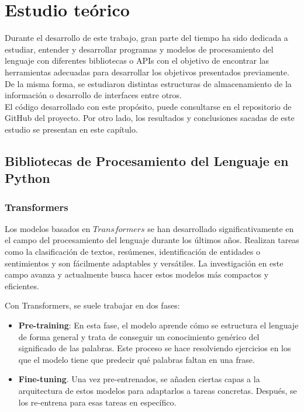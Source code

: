 \chapter{Estudio teórico}
\label{cap:Estudio teórico}
Durante el desarrollo de este trabajo, gran parte del tiempo ha sido dedicada a estudiar, entender y desarrollar programas y modelos de procesamiento del lenguaje con diferentes bibliotecas o APIs con el objetivo de encontrar las herramientas adecuadas para desarrollar los objetivos presentados previamente. De la misma forma, se estudiaron distintas estructuras de almacenamiento de la información o desarrollo de interfaces entre otros. \\

El código desarrollado con este propósito, puede consultarse en el repositorio de GitHub del proyecto. Por otro lado, los resultados y conclusiones sacadas de este estudio se presentan en este capítulo.  

\section{Bibliotecas de Procesamiento del Lenguaje en Python}

\subsection{Transformers}

Los modelos basados en $Transformers$ se han desarrollado significativamente en el campo del procesamiento del lenguaje durante los últimos años. Realizan tareas como la clasificación de textos, resúmenes, identificación de entidades o sentimientos y son fácilmente adaptables y versátiles. La investigación en este campo avanza y actualmente busca hacer estos modelos más compactos y eficientes. 

Con Transformers, se suele trabajar en dos fases:
\begin{itemize}
\item \textbf{Pre-training}: En esta fase, el modelo aprende cómo se estructura el lenguaje de forma general y trata de conseguir un conocimiento genérico del significado de las palabras. Este proceso se hace resolviendo ejercicios en los que el modelo tiene que predecir qué palabras faltan en una frase.

\item \textbf{Fine-tuning}. Una vez pre-entrenados, se añaden ciertas capas a la arquitectura de estos modelos para adaptarlos a tareas concretas. Después, se los re-entrena para esas tareas en específico.
\end{itemize}


